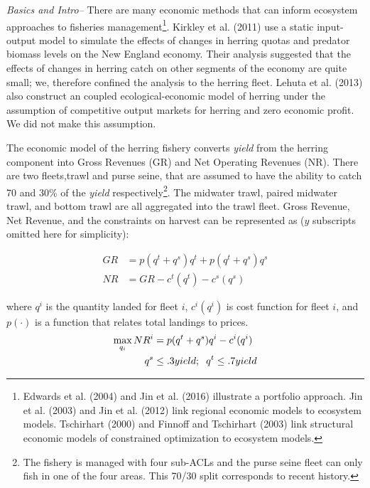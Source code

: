 \documentclass[]{article}
\let\rmarkdownfootnote\footnote%
\def\footnote{\protect\rmarkdownfootnote}
\begin{document}
\emph{Basics and Intro--} There are many economic methods that can
inform ecosystem approaches to fisheries management\footnote{Edwards et
  al. (2004) and Jin et al. (2016) illustrate a portfolio approach. Jin
  et al. (2003) and Jin et al. (2012) link regional economic models to
  ecosystem models. Tschirhart (2000) and Finnoff and Tschirhart (2003)
  link structural economic models of constrained optimization to
  ecosystem models.}. Kirkley et al. (2011) use a static input-output
model to simulate the effects of changes in herring quotas and predator
biomass levels on the New England economy. Their analysis suggested that
the effects of changes in herring catch on other segments of the economy
are quite small; we, therefore confined the analysis to the herring
fleet. Lehuta et al. (2013) also construct an coupled
ecological-economic model of herring under the assumption of competitive
output markets for herring and zero economic profit. We did not make
this assumption.

The economic model of the herring fishery converts \textit{yield} from
the herring component into Gross Revenues (GR) and Net Operating
Revenues (NR). There are two fleets,trawl and purse seine, that are
assumed to have the ability to catch 70 and 30\% of the \textit{yield}
respectively\footnote{The fishery is managed with four sub-ACLs and the
  purse seine fleet can only fish in one of the four areas. This 70/30
  split corresponds to recent history.}. The midwater trawl, paired
midwater trawl, and bottom trawl are all aggregated into the trawl
fleet. Gross Revenue, Net Revenue, and the constraints on harvest can be
represented as (\(y\) subscripts omitted here for simplicity):

\begin{align}
GR&=p(q^t+q^s)q^t+p(q^t+q^s)q^s\\
NR&=GR-c^t(q^t)-c^s(q^s)
\end{align}

where \(q^i\) is the quantity landed for fleet \(i\), \(c^i(q^i)\) is
cost function for fleet \(i\), and \(p(\cdot)\) is a function that
relates total landings to prices.\\

\begin{align}
\label{optimization_problem}
\max_{q_i} NR^i&=p(q^t+q^s)q^i - c^i(q^i)\\
q^s &\leq .3yield; \hspace{2mm} q^t \leq .7yield 
\end{align}
\end{document}
